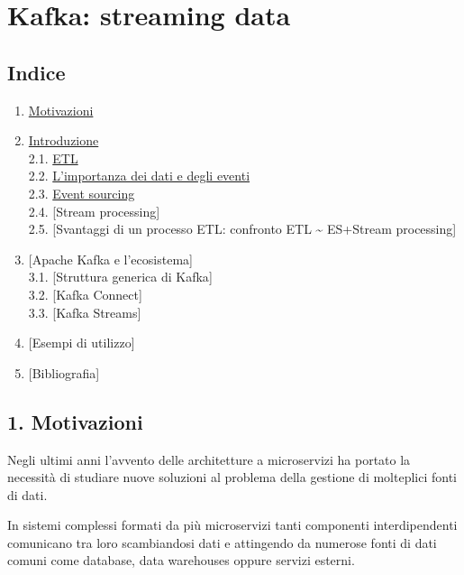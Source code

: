 \documentclass[]{article}
\date{}
\providecommand{\tightlist}{%
  \setlength{\itemsep}{0pt}\setlength{\parskip}{0pt}}
\begin{document}
\section{Kafka: streaming data}\label{kafka-streaming-data}

\subsection{Indice}\label{indice}

\begin{enumerate}
\def\labelenumi{\arabic{enumi}.}
\tightlist
\item
  \protect\hyperlink{motivazioni}{Motivazioni}\\
\item
  \protect\hyperlink{introduzione}{Introduzione}\\
  2.1. \protect\hyperlink{etl}{ETL}\\
  2.2. \protect\hyperlink{intro-data}{L'importanza dei dati e degli
  eventi}\\
  2.3. \protect\hyperlink{event-sourcing}{Event sourcing}\\
  2.4. {[}Stream processing{]}\\
  2.5. {[}Svantaggi di un processo ETL: confronto ETL \textasciitilde{}
  ES+Stream processing{]}
\item
  {[}Apache Kafka e l'ecosistema{]}\\
  3.1. {[}Struttura generica di Kafka{]}\\
  3.2. {[}Kafka Connect{]}\\
  3.3. {[}Kafka Streams{]}\\
\item
  {[}Esempi di utilizzo{]}\\
\item
  {[}Bibliografia{]} \newpage
\end{enumerate}

\hypertarget{motivazioni}{\subsection{1.
Motivazioni}\label{motivazioni}}

Negli ultimi anni l'avvento delle architetture a microservizi ha portato
la necessità di studiare nuove soluzioni al problema della gestione di
molteplici fonti di dati.

In sistemi complessi formati da più microservizi tanti componenti
interdipendenti comunicano tra loro scambiandosi dati e attingendo da
numerose fonti di dati comuni come database, data warehouses oppure
servizi esterni.
\end{document}
